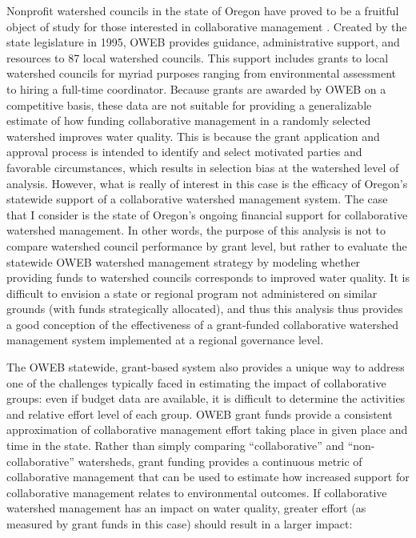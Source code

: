 \documentclass[11pt,a4paper,titlepage]{article}
\begin{document}
Nonprofit watershed councils in the state of Oregon have proved to be a fruitful object of study for those interested in collaborative management \parencite{griffin1999,dakins2005,margerum2002,margerum2007,margerum2008,margerum2011,habron2003,margerum2004,hibbard2006, lurie2008}. Created by the state legislature in 1995, OWEB provides guidance, administrative support, and resources to 87 local watershed councils. This support includes grants to local watershed councils for myriad purposes ranging from environmental assessment to hiring a full-time coordinator. Because grants are awarded by OWEB on a competitive basis, these data are not suitable for providing a generalizable estimate of how funding collaborative management in a randomly selected watershed improves water quality. This is because the grant application and approval process is intended to identify and select motivated parties and favorable circumstances, which results in selection bias at the watershed level of analysis. However, what is really of interest in this case is the efficacy of Oregon’s statewide support of a collaborative watershed management system. The case that I consider is the state of Oregon’s ongoing financial support for collaborative watershed management. In other words, the purpose of this analysis is not to compare watershed council performance by grant level, but rather to evaluate the statewide OWEB watershed management strategy by modeling whether providing funds to watershed councils corresponds to improved water quality. It is difficult to envision a state or regional program not administered on similar grounds (with funds strategically allocated), and thus this analysis thus provides a good conception of the effectiveness of a grant-funded collaborative watershed management system implemented at a regional governance level.

The OWEB statewide, grant-based system also provides a unique way to address one of the challenges typically faced in estimating the impact of collaborative groups: even if budget data are available, it is difficult to determine the activities and relative effort level of each group. OWEB grant funds provide a consistent approximation of collaborative management effort taking place in given place and time in the state. Rather than simply comparing “collaborative” and “non-collaborative” watersheds, grant funding provides a continuous metric of collaborative management that can be used to estimate how increased support for collaborative management relates to environmental outcomes. If collaborative watershed management has an impact on water quality, greater effort (as measured by grant funds in this case) should result in a larger impact:
\end{document}
